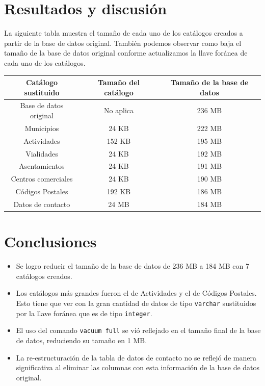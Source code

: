 \documentclass{article}
\begin{document}
\section{Resultados y discusión}

La siguiente tabla muestra el tamaño de cada uno de los catálogos creados a
partir de la base de datos original. También podemos observar como baja el
tamaño de la base de datos original conforme actualizamos la llave foránea de
cada uno de los catálogos.

\begin{table}[h!]
    \centering
\begin{tabular}{c|c|c}
    Catálogo sustituido & Tamaño del catálogo & Tamaño de la base de datos\\
    \hline
    Base de datos original & No aplica & 236 MB \\
    Municipios & 24 KB & 222 MB \\
    Actividades & 152 KB & 195 MB \\
    Vialidades & 24 KB & 192 MB \\
    Asentamientos & 24 KB & 191 MB \\
    Centros comerciales & 24 KB & 190 MB \\
    Códigos Postales & 192 KB & 186 MB\\
    Datos de contacto & 24 MB & 184 MB
\end{tabular}
\end{table}

\section{Conclusiones}
\begin{itemize}
    \item Se logro reducir el tamaño de la base de datos de 236 MB a 184 MB con
    7 catálogos creados.
    \item Los catálogos más grandes fueron el de Actividades y el de Códigos
    Postales. Esto tiene que ver con la gran cantidad de datos de tipo
    \texttt{varchar} sustituidos por la llave foránea que es de tipo
    \texttt{integer}.
    \item El uso del comando \texttt{vacuum full} se vió reflejado en el tamaño
    final de la base de datos, reduciendo su tamaño en 1 MB.
    \item La re-estructuración de la tabla de datos de contacto no se reflejó de
    manera significativa al eliminar las columnas con esta información de la
    base de datos original.
\end{itemize}
\end{document}
